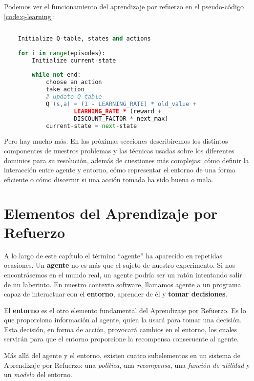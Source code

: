 Podemos ver el funcionamiento del aprendizaje por refuerzo en el pseudo-código \ref{code:q-learning}:

\begin{minipage}{0.9\linewidth}%
    \begin{lstlisting}[frame=tb, language=python, caption=Pseudocódigo Aprendizaje por Refuerzo,   inputencoding=latin1, label={code:q-learning}]
    
    Initialize Q-table, states and actions
    
    for i in range(episodes):
        Initialize current-state
        
        while not end:
            choose an action
            take action
            # update Q-table
            Q'(s,a) = (1 - LEARNING_RATE) * old_value + 
                    LEARNING_RATE * (reward + 
                    DISCOUNT_FACTOR * next_max)
            current-state = next-state
    \end{lstlisting}%
\end{minipage}

Pero hay mucho más. En las próximas secciones describiremos los distintos componentes de nuestros problemas y las técnicas usadas sobre los diferentes dominios para su resolución, además de cuestiones más complejas: cómo definir la interacción entre agente y entorno, cómo representar el entorno de una forma eficiente o cómo discernir si una acción tomada ha sido buena o mala.


\section{Elementos del Aprendizaje por Refuerzo}

A lo largo de este capítulo el término ``agente'' ha aparecido en repetidas ocasiones. Un \textbf{agente} no es más que el sujeto de nuestro experimento. Si nos encontrásemos en el mundo real, un agente podría ser un ratón intentando salir de un laberinto. En nuestro contexto software, llamamos agente a un programa capaz de interactuar con el \textbf{entorno}, aprender de él y \textbf{tomar decisiones}.

El \textbf{entorno} es el otro elemento fundamental del Aprendizaje por Refuerzo. Es lo que proporciona información al agente, quien la usará para tomar una decisión. Esta decisión, en forma de acción, provocará cambios en el entorno, los cuales servirán para que el entorno proporcione la recompensa consecuente al agente.

Más allá del agente y el entorno, existen cuatro subelementos en un sistema de Aprendizaje por Refuerzo: una \textit{política}, una \textit{recompensa}, una \textit{función de utilidad} y un \textit{modelo} del entorno.

